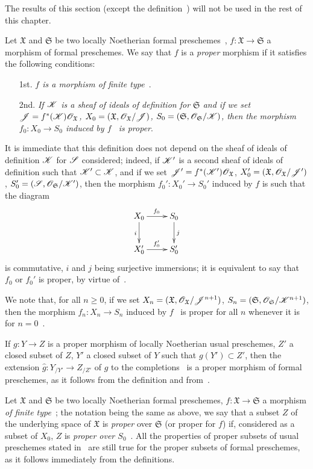 The results of this section (except the definition~) will not be used in the rest of this chapter.

\begin{env}[3.4.1]
\label{III.3.4.1}
Let $\mathfrak{X}$ and $\mathfrak{S}$ be two locally Noetherian formal preschemes~, $f:\mathfrak{X}\to\mathfrak{S}$ a morphism of formal preschemes.
We say that $f$ is a \emph{proper} morphism if it satisfies the following conditions:
\begin{enumerate}
  \item[1st.] \emph{$f$ is a morphism of finite type~}.
  \item[2nd.] \emph{If $\mathscr{K}$ is a sheaf of ideals of definition for $\mathfrak{S}$ and if we set $\mathscr{J}=f^*(\mathscr{K})\mathscr{O}_\mathfrak{X}$, $X_0=(\mathfrak{X},\mathscr{O}_\mathfrak{X}/\mathscr{J})$, $S_0=(\mathfrak{S},\mathscr{O}_\mathfrak{S}/\mathscr{K})$, then the morphism $f_0:X_0\to S_0$ induced by $f$~ is proper}.
\end{enumerate}
It is immediate that this definition does not depend on the sheaf of ideals of definition $\mathscr{K}$ for $\mathscr{S}$ considered; indeed, if $\mathscr{K}'$ is a second sheaf of ideals of definition such that $\mathscr{K}'\subset\mathscr{K}$, and if we set $\mathscr{J}'=f^*(\mathscr{K}')\mathscr{O}_\mathfrak{X}$, $X_0'=(\mathfrak{X},\mathscr{O}_\mathfrak{X}/\mathscr{J}')$, $S_0'=(\mathscr{S},\mathscr{O}_\mathfrak{S}/\mathscr{K}')$, then the morphism $f_0':X_0'\to S_0'$ induced by $f$ is such that the diagram
\[
  \xymatrix{
    X_0\ar[r]^{f_0}\ar[d]_i &
    S_0\ar[d]^j\\
    X_0'\ar[r]^{f_0'} &
    S_0'
  }
\]
is commutative, $i$ and $j$ being surjective immersions; it is equivalent to say that $f_0$ or $f_0'$ is proper, by virtue of~.

We note that, for all $n\geq 0$, if we set $X_n=(\mathfrak{X},\mathscr{O}_\mathfrak{X}/\mathscr{J}^{n+1})$, $S_n=(\mathfrak{S},\mathscr{O}_\mathfrak{S}/\mathscr{K}^{n+1})$, then the morphism $f_n:X_n\to S_n$ induced by $f$~ is proper for all $n$ whenever it is for $n=0$~.

If $g:Y\to Z$ is a proper morphism of locally Noetherian usual preschemes, $Z'$ a closed subset of $Z$, $Y'$ a closed subset of $Y$ such that $g(Y')\subset Z'$, then the extension $\widehat{g}:Y_{/Y'}\to Z_{/Z'}$ of $g$ to the completions~ is a proper morphism of formal preschemes, as it follows from the definition and from~.

Let $\mathfrak{X}$ and $\mathfrak{S}$ be two locally Noetherian formal preschemes, $f:\mathfrak{X}\to\mathfrak{S}$ a morphism \emph{of finite type}~; the notation being the same as above, we say that a subset $Z$ of the underlying space of $\mathfrak{X}$ is \emph{proper} over $\mathfrak{S}$ (or proper for $f$) if, considered as a subset of $X_0$, $Z$ is \emph{proper over $S_0$}~.
All the properties of proper subsets of usual preschemes stated in~ are still true for the proper subsets of formal preschemes, as it follows immediately from the definitions.
\end{env}

